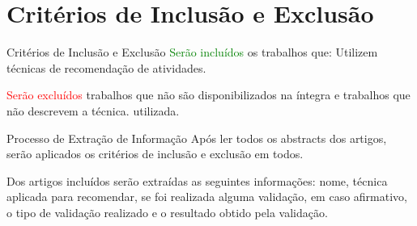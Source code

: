 \documentclass[compress]{beamer}
\begin{document}
\section{Critérios de Inclusão e Exclusão}
\begin{frame}{}

\begin{block}{Critérios de Inclusão e Exclusão}
\textcolor{green}{Serão incluídos} os trabalhos que: Utilizem técnicas de recomendação de atividades.

\textcolor{red}{Serão excluídos} trabalhos que não são disponibilizados na íntegra e trabalhos que não descrevem a técnica. utilizada.
\end{block}

\begin{block}{Processo de Extração de Informação}
Após ler todos os abstracts dos artigos, serão aplicados os critérios de inclusão e exclusão em todos. 

Dos artigos incluídos serão extraídas as seguintes informações: nome, técnica aplicada para recomendar, se foi realizada alguma validação, em caso afirmativo, o tipo de validação realizado e o resultado obtido pela validação. 
\end{block}

\end{frame}
\end{document}
